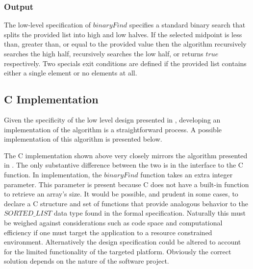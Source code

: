 \documentclass[letterpaper,10pt,draft]{book}
\begin{document}
\newpage
\subsubsection{Output}
   \label{sect:FirstExLLDZ}



The low-level specification of $binaryFind$ specifies a standard binary search that
splits the provided list into high and low halves.  If the selected midpoint is
less than, greater than, or equal to the provided value then the algorithm recursively
searches the high half, recursively searches the low half, or returns $true$ respectively.
Two specials exit conditions are defined if the provided list contains either a
single element or no elements at all.

\let\OZPARSortedList\undefined
\let\OZPARBinnaryFinnd\undefined

\newpage
\subsection{C Implementation}
   \label{sect:FirstExImplC}

Given the specificity of the low level design presented in ,
developing an implementation of the algorithm is a straightforward process.  A possible
implementation of this algorithm is presented below.



The C implementation shown above very closely mirrors the algorithm presented in
.  The only substantive difference between the two is in
the interface to the C function.  In implementation, the $binaryFind$ function takes
an extra integer parameter.  This parameter is present because C does not have a
built-in function to retrieve an array's size.  It would be possible, and prudent
in some cases, to declare a C structure and set of functions that provide analogous
behavior to the $SORTED\_LIST$ data type found in the formal specification.  Naturally
this must be weighed against considerations such as code space and computational
efficiency if one must target the application to a resource constrained environment.
Alternatively the design specification could be altered to account for the limited
functionality of the targeted platform.  Obviously the correct solution depends
on the nature of the software project.
\end{document}
